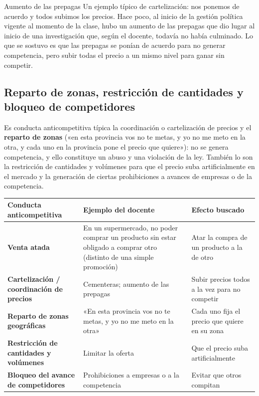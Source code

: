 \documentclass[12pt,oneside]{book}
\begin{document}
\begin{example}{Aumento de las prepagas}
Un ejemplo típico de cartelización: nos ponemos de acuerdo y todos subimos los precios. Hace poco, al inicio de la gestión política vigente al momento de la clase, hubo un aumento de las prepagas que dio lugar al inicio de una investigación que, según el docente, todavía no había culminado. Lo que se sostuvo es que las prepagas se ponían de acuerdo para no generar competencia, pero subir todas el precio a un mismo nivel para ganar sin competir.
\end{example}

\subsection{Reparto de zonas, restricción de cantidades y bloqueo de competidores}

Es conducta anticompetitiva típica la coordinación o cartelización de precios y el \textbf{reparto de zonas} («en esta provincia vos no te metas, y yo no me meto en la otra, y cada uno en la provincia pone el precio que quiere»): no se genera competencia, y ello constituye un abuso y una violación de la ley. También lo son la restricción de cantidades y volúmenes para que el precio suba artificialmente en el mercado y la generación de ciertas prohibiciones a avances de empresas o de la competencia.

\begin{table}[H]
\centering
\renewcommand{\arraystretch}{1.25}
\begin{tabularx}{\textwidth}{
    >{\raggedright\arraybackslash}p{}
    >{\raggedright\arraybackslash}X
    >{\raggedright\arraybackslash}X
}
\toprule
\textbf{Conducta anticompetitiva} & \textbf{Ejemplo del docente} & \textbf{Efecto buscado} \\
\midrule
\textbf{Venta atada} & En un supermercado, no poder comprar un producto sin estar obligado a comprar otro (distinto de una simple promoción) & Atar la compra de un producto a la de otro \\
\textbf{Cartelización / coordinación de precios} & Cementeras; aumento de las prepagas & Subir precios todos a la vez para no competir \\
\textbf{Reparto de zonas geográficas} & «En esta provincia vos no te metas, y yo no me meto en la otra» & Cada uno fija el precio que quiere en su zona \\
\textbf{Restricción de cantidades y volúmenes} & Limitar la oferta & Que el precio suba artificialmente \\
\textbf{Bloqueo del avance de competidores} & Prohibiciones a empresas o a la competencia & Evitar que otros compitan \\
\bottomrule
\end{tabularx}
\end{table}
\end{document}
